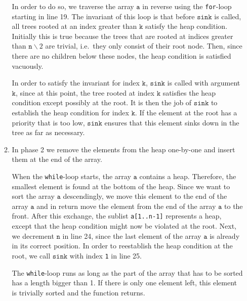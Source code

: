 \begin{enumerate}
\begin{enumerate}
            In order to do so, we traverse the array $\mathtt{a}$ in reverse using the
            \texttt{for}-loop starting in line 19.  The invariant of this loop is that before
            $\mathtt{sink}$ is called, all trees rooted at an index greater than
            $\mathtt{k}$ satisfy the heap condition.  Initially this is true because the trees that
            are rooted at indices greater than $\mathtt{n}\backslash 2$ are trivial, i.e.~they only
            consist of their root node.  Then, since there are no children below these nodes, the heap
            condition is satisfied vacuously. 
            
            In order to satisfy the invariant for index $\mathtt{k}$, $\mathtt{sink}$ is called with
            argument $\mathtt{k}$,  since at this point, the tree rooted at index $\mathtt{k}$ satisfies
            the heap condition except possibly at the root.  It is then the job of $\mathtt{sink}$ to
            establish the heap condition for index $\mathtt{k}$.  If the element at the root has a
            priority that is too low, $\mathtt{sink}$ ensures that this element sinks down in the tree
            as far as necessary.
      \item In phase 2 we remove the elements from the heap one-by-one and insert them at the end of
            the array.

            When the \texttt{while}-loop starts, the array $\mathtt{a}$ contains a heap.  Therefore,
            the smallest element is found at the bottom of the heap.  Since we want to sort the
            array $\mathtt{a}$ descendingly, we move this element to the end of the array $\mathtt{a}$ and in
            return move the element from the end of the array $\mathtt{a}$ to the front.
            After this exchange, the sublist \texttt{a[1..n-1]} represents a heap, except that the
            heap condition might now be violated at the root.  Next, we decrement $\mathtt{n}$ in line 24, since the
            last element of the array $\mathtt{a}$ is already in its correct position.  
            In order to reestablish the heap condition at the root, we call $\mathtt{sink}$ with index
            \texttt{1} in line 25.

            The \texttt{while}-loop runs as long as the part of the array that has to be sorted has
            a length bigger than 1.  If there is only one element left, this element is trivially
            sorted and the function returns.
      \end{enumerate}
\end{enumerate}

